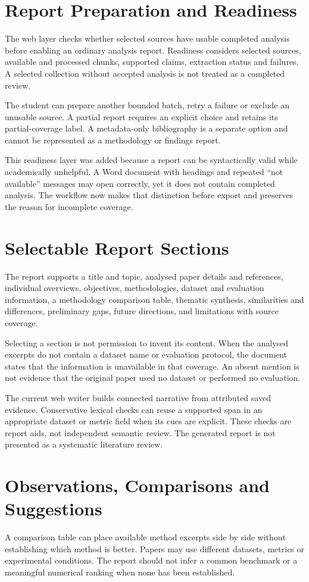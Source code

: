 \section{Report Preparation and Readiness}
The web layer checks whether selected sources have usable completed analysis before enabling an ordinary analysis report. Readiness considers selected sources, available and processed chunks, supported claims, extraction status and failures. A selected collection without accepted analysis is not treated as a completed review.

The student can prepare another bounded batch, retry a failure or exclude an unusable source. A partial report requires an explicit choice and retains its partial-coverage label. A metadata-only bibliography is a separate option and cannot be represented as a methodology or findings report.

This readiness layer was added because a report can be syntactically valid while academically unhelpful. A Word document with headings and repeated ``not available'' messages may open correctly, yet it does not contain completed analysis. The workflow now makes that distinction before export and preserves the reason for incomplete coverage.

\section{Selectable Report Sections}
The report supports a title and topic, analysed paper details and references, individual overviews, objectives, methodologies, dataset and evaluation information, a methodology comparison table, thematic synthesis, similarities and differences, preliminary gaps, future directions, and limitations with source coverage.

Selecting a section is not permission to invent its content. When the analysed excerpts do not contain a dataset name or evaluation protocol, the document states that the information is unavailable in that coverage. An absent mention is not evidence that the original paper used no dataset or performed no evaluation.

The current web writer builds connected narrative from attributed saved evidence. Conservative lexical checks can reuse a supported span in an appropriate dataset or metric field when its cues are explicit. These checks are report aids, not independent semantic review. The generated report is not presented as a systematic literature review.

\section{Observations, Comparisons and Suggestions}
A comparison table can place available method excerpts side by side without establishing which method is better. Papers may use different datasets, metrics or experimental conditions. The report should not infer a common benchmark or a meaningful numerical ranking when none has been established.

